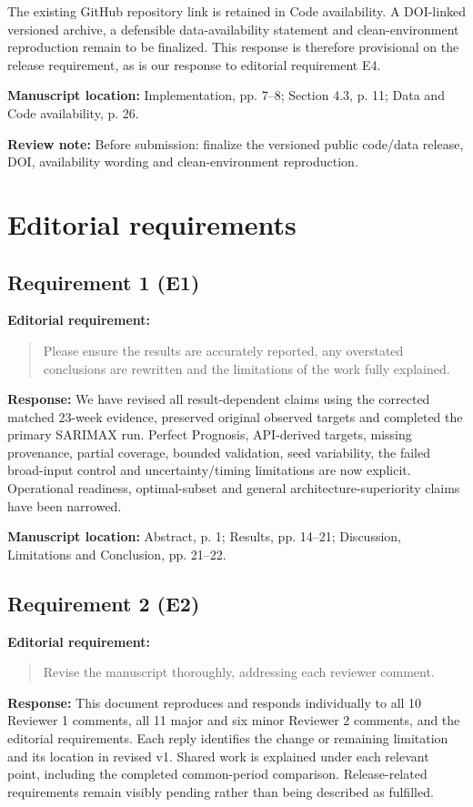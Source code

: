 \documentclass[11pt,a4paper]{article}
\newcommand{\reviewnote}[1]{\par\noindent\colorbox{yellow!25}{\parbox{\dimexpr\linewidth-2\fboxsep\relax}{\small\textbf{Review note:} #1}}\par}
\begin{document}
The existing GitHub repository link is retained in Code availability. A DOI-linked versioned archive, a defensible data-availability statement and clean-environment reproduction remain to be finalized. This response is therefore provisional on the release requirement, as is our response to editorial requirement E4.

\textbf{Manuscript location:} Implementation, pp. 7--8; Section 4.3, p. 11; Data and Code availability, p. 26.
\reviewnote{Before submission: finalize the versioned public code/data release, DOI, availability wording and clean-environment reproduction.}
\clearpage
\section*{Editorial requirements}
\begin{samepage}
\subsection*{Requirement 1 (E1)}
\textbf{Editorial requirement:}
\begin{quote}\small Please ensure the results are accurately reported, any overstated conclusions are rewritten and the limitations of the work fully explained.\end{quote}
\end{samepage}
\textbf{Response:}
We have revised all result-dependent claims using the corrected matched 23-week evidence, preserved original observed targets and completed the primary SARIMAX run. Perfect Prognosis, API-derived targets, missing provenance, partial coverage, bounded validation, seed variability, the failed broad-input control and uncertainty/timing limitations are now explicit. Operational readiness, optimal-subset and general architecture-superiority claims have been narrowed.

\textbf{Manuscript location:} Abstract, p. 1; Results, pp. 14--21; Discussion, Limitations and Conclusion, pp. 21--22.
\begin{samepage}
\subsection*{Requirement 2 (E2)}
\textbf{Editorial requirement:}
\begin{quote}\small Revise the manuscript thoroughly, addressing each reviewer comment.\end{quote}
\end{samepage}
\textbf{Response:}
This document reproduces and responds individually to all 10 Reviewer 1 comments, all 11 major and six minor Reviewer 2 comments, and the editorial requirements. Each reply identifies the change or remaining limitation and its location in revised v1. Shared work is explained under each relevant point, including the completed common-period comparison. Release-related requirements remain visibly pending rather than being described as fulfilled.
\end{document}

